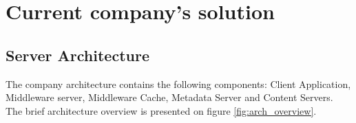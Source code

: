 \section{Current company's solution}

\subsection{Server Architecture}

The company architecture contains the following components: Client Application, Middleware server, Middleware Cache, Metadata Server and Content Servers. The brief architecture overview is presented on figure \ref{fig:arch_overview}. 











